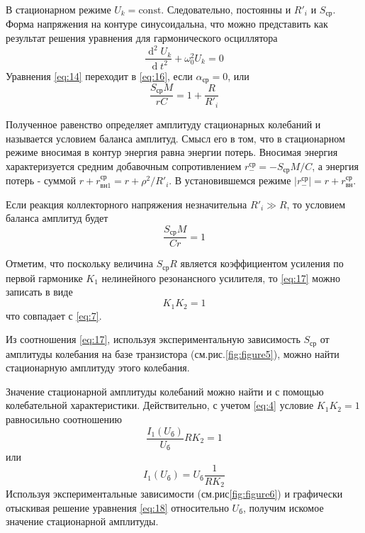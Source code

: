 В стационарном режиме $U_k=\text{const}$. Следовательно, постоянны и $R'_i$ и $S_\text{ср}$. Форма напряжения на контуре синусоидальна, что можно представить как результат решения уравнения для гармонического осциллятора
\begin{equation}
\frac{\operatorname d^2U_k}{\operatorname dt^2}+\omega_0^2U_k=0
\label{eq:16}
\end{equation}
Уравнения \eqref{eq:14} переходит в \eqref{eq:16}, если $\alpha_\text{ср}=0$, или
\begin{equation*}
\frac{S_\text{ср}M}{rC}=1+\frac{R}{R'_i}
\end{equation*}

Полученное равенство определяет амплитуду стационарных колебаний и называется условием баланса амплитуд. Смысл его в том, что в стационарном режиме вносимая в контур энергия равна энергии потерь. Вносимая энергия характеризуется средним добавочным сопротивлением $r^\text{ср}_{-}=-S_\text{ср}M/C$, а энергия потерь - суммой $r+r^\text{ср}_{\text{вн}1}=r+\rho^2/R'_i$. В установившемся режиме $|r^\text{ср}_{-}|=r+r^\text{ср}_\text{вн}$.

Если реакция коллекторного напряжения незначительна $R'_i\gg R$, то условием баланса амплитуд будет
\begin{equation}
\frac{S_\text{ср}M}{Cr}=1
\label{eq:17}
\end{equation}

Отметим, что поскольку величина $S_\text{ср}R$ является коэффициентом усиления по первой гармонике $K_1$ нелинейного резонансного усилителя, то \eqref{eq:17} можно записать в виде
\begin{equation*}
K_1K_2=1
\end{equation*}
что совпадает с \eqref{eq:7}.

Из соотношения \eqref{eq:17}, используя экспериментальную зависимость $S_\text{ср}$ от амплитуды колебания на базе транзистора (см.рис.\ref{fig:figure5}), можно найти стационарную амплитуду этого колебания.

Значение стационарной амплитуды колебаний можно найти и с помощью колебательной характеристики. Действительно, с учетом \eqref{eq:4} условие $K_1K_2=1$ равносильно соотношению
\begin{equation*}
\frac{I_1(U_\text{б})}{U_\text{б}}RK_2=1
\end{equation*}
или
\begin{equation}
I_1(U_\text{б})=U_\text{б}\frac{1}{RK_2}
\label{eq:18}
\end{equation}
Используя экспериментальные зависимости (см.рис\ref{fig:figure6}) и графически отыскивая решение уравнения \eqref{eq:18} относительно $U_\text{б}$, получим искомое значение стационарной амплитуды.
